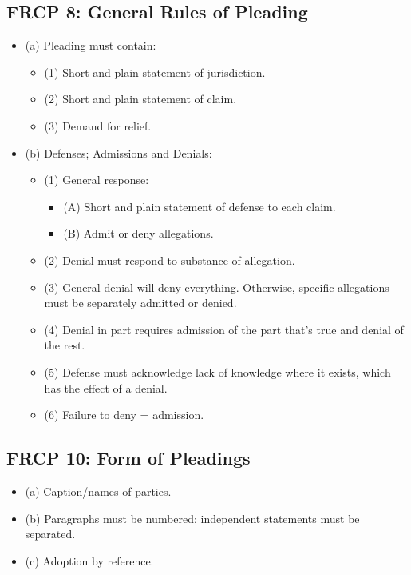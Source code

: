 \subsection{FRCP 8: General Rules of Pleading}

\begin{itemize}
    \item (a) Pleading must contain:
    \begin{itemize}
        \item (1) Short and plain statement of jurisdiction.
        \item (2) Short and plain statement of claim.
        \item (3) Demand for relief.
    \end{itemize}
    \item (b) Defenses; Admissions and Denials:
    \begin{itemize}
        \item (1) General response:
        \begin{itemize}
            \item (A) Short and plain statement of defense to each claim.
            \item (B) Admit or deny allegations.
        \end{itemize}
        \item (2) Denial must respond to substance of allegation.
        \item (3) General denial will deny everything. Otherwise, specific 
        allegations must be separately admitted or denied.
        \item (4) Denial in part requires admission of the part that's true 
        and denial of the rest.
        \item (5) Defense must acknowledge lack of knowledge where it exists, 
        which has the effect of a denial.
        \item (6) Failure to deny = admission.
    \end{itemize}
\end{itemize}

\subsection{FRCP 10: Form of Pleadings}

\begin{itemize}
    \item (a) Caption/names of parties.
    \item (b) Paragraphs must be numbered; independent statements must be 
    separated.
    \item (c) Adoption by reference.
\end{itemize}

